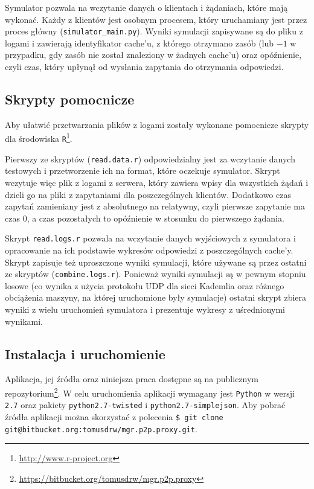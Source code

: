 \documentclass[a4paper,11pt]{scrartcl}
\newcommand{\f}{\texttt}
\newcommand{\keszy}{cache'y}
\newcommand{\keszu}{cache'u}
\begin{document}
Symulator pozwala na wczytanie danych o klientach i żądaniach, które mają wykonać. Każdy z klientów jest osobnym procesem, który uruchamiany jest przez proces główny (\f{simulator\_main.py}). Wyniki symulacji zapisywane są do pliku z logami i zawierają identyfikator \keszu, z którego otrzymano zasób (lub $-1$ w przypadku, gdy zasób nie został znaleziony w żadnych \keszu) oraz opóźnienie, czyli czas, który upłynął od wysłania zapytania do otrzymania odpowiedzi.

\subsection{Skrypty pomocnicze}
Aby ułatwić przetwarzania plików z logami zostały wykonane pomocnicze skrypty dla środowiska \f{R}\footnote{\url{http://www.r-project.org}}. 

Pierwszy ze skryptów (\f{read.data.r}) odpowiedzialny jest za wczytanie danych testowych i przetworzenie ich na format, które oczekuje symulator. Skrypt wczytuje więc plik z logami z serwera, który zawiera wpisy dla wszystkich żądań i dzieli go na pliki z zapytaniami dla poszczególnych klientów. Dodatkowo czas zapytań zamieniany jest z absolutnego na relatywny, czyli pierwsze zapytanie ma czas $0$, a czas pozostałych to opóźnienie w stosunku do pierwszego żądania.

Skrypt \f{read.logs.r} pozwala na wczytanie danych wyjściowych z symulatora i opracowanie na ich podstawie wykresów odpowiedzi z poszczególnych \keszy. Skrypt zapisuje też uproszczone wyniki symulacji, które używane są przez ostatni ze skryptów (\f{combine.logs.r}). Ponieważ wyniki symulacji są w pewnym stopniu losowe (co wynika z użycia protokołu UDP dla sieci Kademlia oraz różnego obciążenia maszyny, na której uruchomione były symulacje) ostatni skrypt zbiera wyniki z wielu uruchomień symulatora i prezentuje wykresy z uśrednionymi wynikami.

\subsection{Instalacja i uruchomienie}
\label{sect_impl_install}
Aplikacja, jej źródła oraz niniejsza praca dostępne są na publicznym repozytorium\footnote{\url{https://bitbucket.org/tomusdrw/mgr.p2p.proxy}}. W celu uruchomienia aplikacji wymagany jest \f{Python} w wersji \f{2.7} oraz pakiety \f{python2.7-twisted} i \f{python2.7-simplejson}. Aby pobrać źródła aplikacji można skorzystać z polecenia \f{\$ git clone git@bitbucket.org:tomusdrw/mgr.p2p.proxy.git}.
\end{document}
